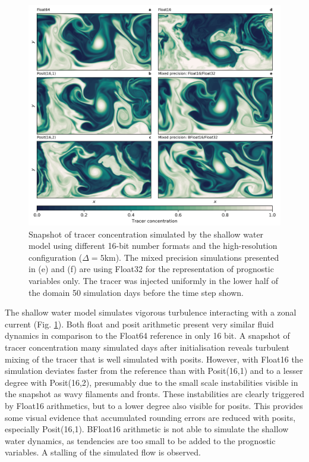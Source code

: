 \documentclass[draft]{agujournal2019}
\begin{document}
\begin{figure}
\includegraphics[width=1\textwidth]{snapshot.png}
\caption{Snapshot of tracer concentration simulated by the shallow water model
using different 16-bit number formats and the high-resolution configuration
($\Delta = 5$km). The mixed precision simulations presented in (e) and (f) are
using Float32 for the representation of prognostic variables only. The tracer
was injected uniformly in the lower half of the domain 50 simulation days before
the time step shown.}
\label{fig:snapshot}
\end{figure}

The shallow water model simulates vigorous turbulence interacting with a
zonal current (Fig. \ref{fig:snapshot}). Both float and posit arithmetic
present very similar fluid dynamics in comparison to the Float64 reference in
only 16 bit. A snapshot of tracer concentration many simulated days after
initialisation reveals turbulent mixing of the tracer that is well simulated
with posits. However, with Float16 the simulation deviates faster from the
reference than with Posit(16,1) and to a lesser degree with Posit(16,2),
presumably due to the small scale instabilities visible in the snapshot as
wavy filaments and fronts. These instabilities are clearly triggered by Float16
arithmetics, but to a lower degree also visible for posits. This provides some
visual evidence that accumulated rounding errors are reduced with posits, especially
Posit(16,1). BFloat16 arithmetic is not able to simulate the shallow water dynamics,
as tendencies are too small to be added to the prognostic variables. A stalling
of the simulated flow is observed.
\end{document}
